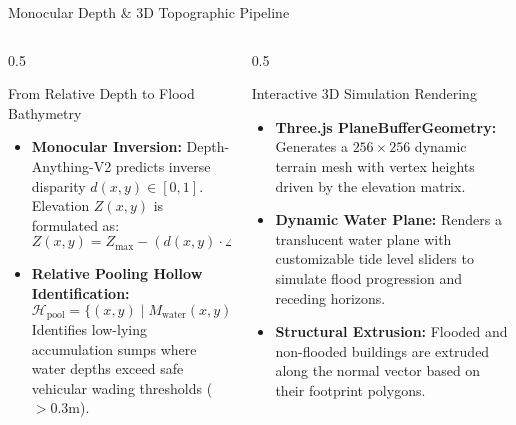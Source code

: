 \documentclass[aspectratio=169, 10pt, professionalfonts]{beamer}
\begin{document}
\begin{frame}{Monocular Depth \& 3D Topographic Pipeline}
  \begin{columns}[T]
    \begin{column}{0.5\textwidth}
      \begin{block}{From Relative Depth to Flood Bathymetry}
        \begin{itemize}\setlength{\itemsep}{0.5em}\footnotesize
          \item \textbf{Monocular Inversion:} Depth-Anything-V2 predicts inverse disparity $d(x,y) \in [0, 1]$. Elevation $Z(x,y)$ is formulated as:
            $$Z(x, y) = Z_{\text{max}} - (d(x, y) \cdot \Delta Z)$$
          \item \textbf{Relative Pooling Hollow Identification:}
            $$\mathcal{H}_{\text{pool}} = \{(x, y) \mid M_{\text{water}}(x, y) = 1 \;\land\; Z(x, y) \le \tau_{\text{elevation}}\}$$
            Identifies low-lying accumulation sumps where water depths exceed safe vehicular wading thresholds ($>0.3\text{m}$).
        \end{itemize}
      \end{block}
    \end{column}
    
    \begin{column}{0.5\textwidth}
      \begin{block}{Interactive 3D Simulation Rendering}
        \begin{itemize}\setlength{\itemsep}{0.5em}\footnotesize
          \item \textbf{Three.js PlaneBufferGeometry:} Generates a $256\times256$ dynamic terrain mesh with vertex heights driven by the elevation matrix.
          \item \textbf{Dynamic Water Plane:} Renders a translucent water plane with customizable tide level sliders to simulate flood progression and receding horizons.
          \item \textbf{Structural Extrusion:} Flooded and non-flooded buildings are extruded along the normal vector based on their footprint polygons.
        \end{itemize}
      \end{block}
    \end{column}
  \end{columns}
\end{frame}
\end{document}
